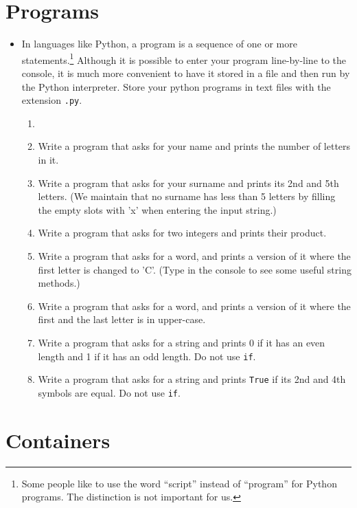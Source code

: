 \documentclass[a4paper]{article}
\begin{document}
\section{Programs}

\begin{itemize} \item In languages like Python, a program is a sequence of one
or more statements.\footnote{Some people like to use the word ``script'' instead
of ``program'' for Python programs. The distinction is not important for us.}
Although it is possible to enter your program line-by-line to the console, it is
much more convenient to have it stored in a file and then run by the Python
interpreter. Store your python programs in text files with the extension
\Verb+.py+. 

\begin{uexercise}

\begin{enumerate}
\item[]
\item Write a program that asks for your name and prints the number of letters
in it.
\item Write a program that asks for your surname and prints its 2nd and 5th
letters. (We maintain that no surname has less than 5 letters by filling the
empty slots with 'x' when entering the input string.)
\item Write a program that asks for two integers and prints their product.
\item Write a program that asks for a word, and prints a version of it where the
first letter is changed to 'C'. (Type  in the console to see some
useful string methods.)
\item Write a program that asks for a word, and prints a version of it where the
first and the last letter is in upper-case.
\item Write a program that asks for a string and prints 0 if it has an even
length and 1 if it has an odd length. Do not use \Verb+if+.
\item Write a program that asks for a string and prints \Verb+True+ if its
2nd and 4th symbols are equal. Do not use \Verb+if+.
\end{enumerate}

\end{uexercise}

\end{itemize}

\section{Containers}
\end{document}
